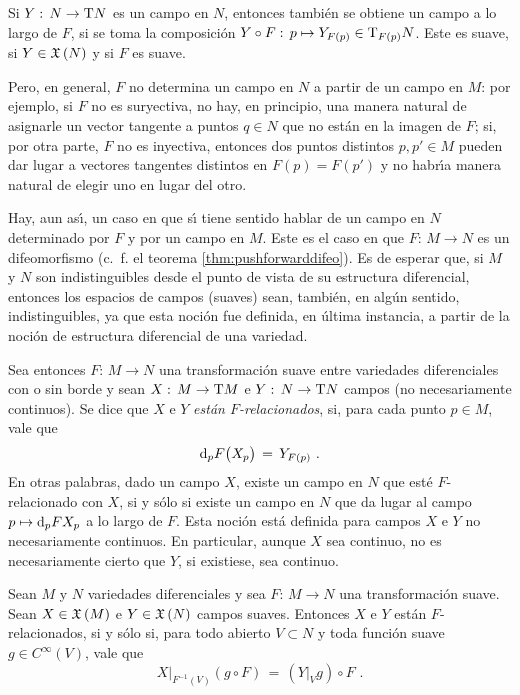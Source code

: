Si $Y:\,N\rightarrow\tangente{N}$ es un campo en $N$, entonces tambi\'{e}n
se obtiene un campo a lo largo de $F$, si se toma la composici\'{o}n
$Y\circ F:\,p\mapsto Y_{F(p)}\in\tangente[F(p)]{N}$. Este es suave, si
$Y\in\mathfrak{X}\left(N\right)$ y si $F$ es suave.

Pero, en general, $F$ no determina un campo en $N$ a partir de un campo en
$M$: por ejemplo, si $F$ no es suryectiva, no hay, en principio, una manera
natural de asignarle un vector tangente a puntos $q\in N$ que no est\'{a}n
en la imagen de $F$; si, por otra parte, $F$ no es inyectiva, entonces
dos puntos distintos $p,p'\in M$ pueden dar lugar a vectores tangentes
distintos en $F(p)=F(p')$ y no habr\'{\i}a manera natural de elegir uno en
lugar del otro.

Hay, aun as\'{\i}, un caso en que s\'{\i} tiene sentido hablar de un campo
en $N$ determinado por $F$ y por un campo en $M$. Este es el caso en que
$F:\,M\rightarrow N$ es un difeomorfismo (c.~f. el teorema
\ref{thm:pushforwarddifeo}). Es de esperar que, si $M$ y $N$
son indistinguibles desde el punto de vista de su estructura diferencial,
entonces los espacios de campos (suaves) sean, tambi\'{e}n, en alg\'{u}n
sentido, indistinguibles, ya que esta noci\'{o}n fue definida, en \'{u}ltima
instancia, a partir de la noci\'{o}n de estructura diferencial de una
variedad.

Sea entonces $F:\,M\rightarrow N$ una transformaci\'{o}n suave entre
variedades diferenciales con o sin borde y sean $X:\,M\rightarrow\tangente{M}$
e $Y:\,N\rightarrow\tangente{N}$ campos (no necesariamente continuos).
Se dice que $X$ e $Y$ \emph{est\'{a}n $F$-relacionados}, si, para cada punto
$p\in M$, vale que
\begin{equation}
	\label{eq:frelacionadosi}
	\diferencial[p]{F}\big(X_{p}\big) \,=\, Y_{F(p)}
	\text{ .}
\end{equation}
%
En otras palabras, dado un campo $X$, existe un campo en $N$ que est\'{e}
$F$-relacionado con $X$, si y s\'{o}lo si existe un campo en $N$ que da
lugar al campo $p\mapsto \diferencial[p]{F}X_{p}$ a lo largo de $F$. Esta
noci\'{o}n est\'{a} definida para campos $X$ e $Y$ no necesariamente
continuos. En particular, aunque $X$ sea continuo, no es necesariamente
cierto que $Y$, si existiese, sea continuo.

\begin{propoFRelacionados}\label{thm:frelacionados}
	Sean $M$ y $N$ variedades diferenciales y sea $F:\,M\rightarrow N$
	una transformaci\'{o}n suave. Sean $X\in\mathfrak{X}\left(M\right)$ e $Y\in\mathfrak{X}\left(N\right)$
	campos suaves. Entonces $X$ e $Y$ est\'{a}n $F$-relacionados,
	si y s\'{o}lo si, para todo abierto $V\subset N$ y toda
	funci\'{o}n suave $g\in C^{\infty}(V)$, vale que
	\begin{equation}
		\label{eq:frelacionadosii}
		X|_{F^{-1}(V)}(g\circ F) \,=\, (Y|_{V}g)\circ F
		\text{ .}
	\end{equation}
\end{propoFRelacionados}

